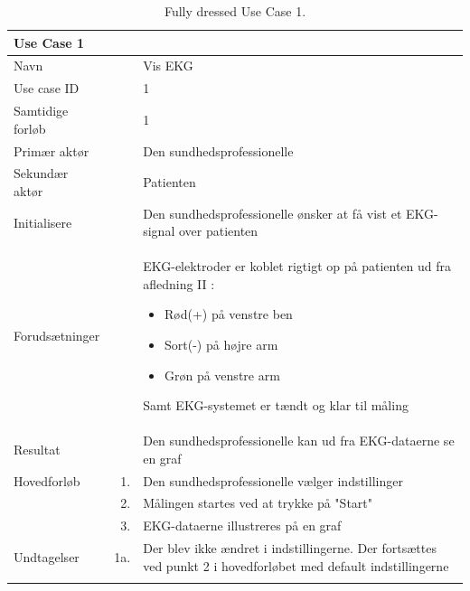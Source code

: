 \begin{longtabu} to  %
    {\large \textbf{Use Case 1}} && \\
    \toprule
    Navn &&    Vis EKG\\
    Use case ID &&    1\\
    Samtidige forløb &&    1\\
    Primær aktør &&    Den sundhedsprofessionelle\\
    Sekundær aktør &&	Patienten\\
    Initialisere &&    Den sundhedsprofessionelle ønsker at få vist et EKG-signal over patienten\\
    Forudsætninger &&    EKG-elektroder er koblet rigtigt op på patienten ud fra afledning II :
     \begin{itemize}
     	\item Rød(+) på venstre ben
     	\item Sort(-) på højre arm
     	\item Grøn på venstre arm
     \end{itemize}
		Samt EKG-systemet er tændt og klar til måling\\
    Resultat &&    Den sundhedsprofessionelle kan ud fra EKG-dataerne se en graf                     \\ \midrule
    Hovedforløb &    1. &    Den sundhedsprofessionelle vælger indstillinger\\[-1ex]	
                &    2. &    Målingen startes ved at trykke på "Start"\\[-1ex]
                &    3. &    EKG-dataerne illustreres på en graf\\ \midrule
                
    Undtagelser &    1a. &    Der blev ikke ændret i indstillingerne. Der fortsættes ved punkt 2 i hovedforløbet med default indstillingerne \\ \bottomrule
\caption{Fully dressed Use Case 1.}
\label{UC1}
\end{longtabu}

